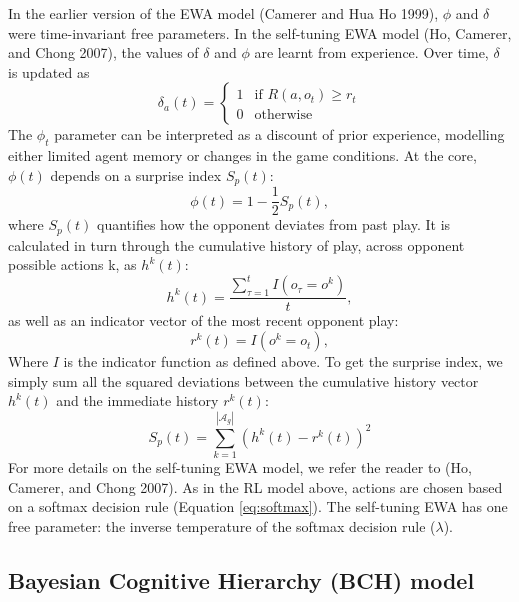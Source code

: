 \documentclass[smallextended]{svjour3}       %
\begin{document}
In the earlier version of the EWA model (Camerer and Hua Ho 1999),
\(\phi\) and \(\delta\) were time-invariant free parameters. In the
self-tuning EWA model (Ho, Camerer, and Chong 2007), the values of
\(\delta\) and \(\phi\) are learnt from experience. Over time,
\(\delta\) is updated as
\[\delta_{a}(t) = \begin{cases} 1 & \text{if }  R(a,o_{t}) \geq r_{t}  \\
0 & \text{otherwise} \end{cases}\] The \(\phi_{t}\) parameter can be
interpreted as a discount of prior experience, modelling either limited
agent memory or changes in the game conditions. At the core, \(\phi(t)\)
depends on a surprise index \(S_{p}(t)\):
\[\phi(t) = 1 - \frac{1}{2}S_{p}(t) ,\] where \(S_{p}(t)\) quantifies
how the opponent deviates from past play. It is calculated in turn
through the cumulative history of play, across opponent possible actions
k, as \(h^{k}(t)\):
\[h^{k}(t)= \frac{ \sum_{\tau = 1}^t  I( o_{\tau} = o^k )} {t}, \] as
well as an indicator vector of the most recent opponent play:
\[r^k(t) = I(o^k=o_{t}), \] Where \(I\) is the indicator function as
defined above. To get the surprise index, we simply sum all the squared
deviations between the cumulative history vector \(h^{k}(t)\) and the
immediate history \(r^k(t)\):
\[S_{p}(t) = \sum_{k=1}^{|\mathcal{A}_g|} (h^{k}(t) - r^k(t))^2 \] For
more details on the self-tuning EWA model, we refer the reader to (Ho,
Camerer, and Chong 2007). As in the RL model above, actions are chosen
based on a softmax decision rule (Equation \ref{eq:softmax}). The
self-tuning EWA has one free parameter: the inverse temperature of the
softmax decision rule (\(\lambda\)).

\hypertarget{bayesian-cognitive-hierarchy-bch-model}{%
\subsection{Bayesian Cognitive Hierarchy (BCH)
model}\label{bayesian-cognitive-hierarchy-bch-model}}
\end{document}
